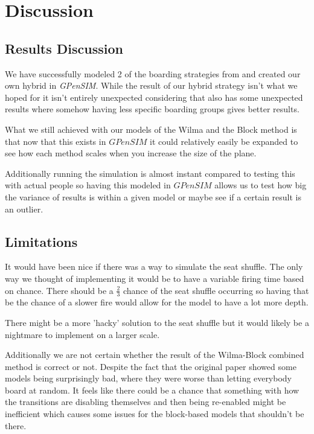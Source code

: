\documentclass[english]{article}
\begin{document}
\section{Discussion}
\subsection{Results Discussion}
We have successfully modeled 2 of the boarding strategies from  and created our own hybrid in \emph{GPenSIM}. While the result of our hybrid strategy isn't what we hoped for it isn't entirely unexpected considering that  also has some unexpected results where somehow having less specific boarding groups gives better results.

What we still achieved with our models of the Wilma and the Block method is that now that this exists in $GPenSIM$ it could relatively easily be expanded to see how each method scales when you increase the size of the plane. 

Additionally running the simulation is almost instant compared to testing this with actual people so having this modeled in $GPenSIM$ allows us to test how big the variance of results is within a given model or maybe see if a certain result is an outlier. 

\subsection{Limitations}
It would have been nice if there was a way to simulate the seat shuffle. The only way we thought of implementing it would be to have a variable firing time based on chance. There should be a $\frac{2}{3}$ chance of the seat shuffle occurring so having that be the chance of a slower fire would allow for the model to have a lot more depth. 

There might be a more 'hacky' solution to the seat shuffle but it would likely be a nightmare to implement on a larger scale. 

Additionally we are not certain whether the result of the Wilma-Block combined method is correct or not. Despite the fact that the original paper showed some models being surprisingly bad, where they were worse than letting everybody board at random. It feels like there could be a chance that something with how the transitions are disabling themselves and then being re-enabled might be inefficient which causes some issues for the block-based models that shouldn't be there. 
\end{document}
